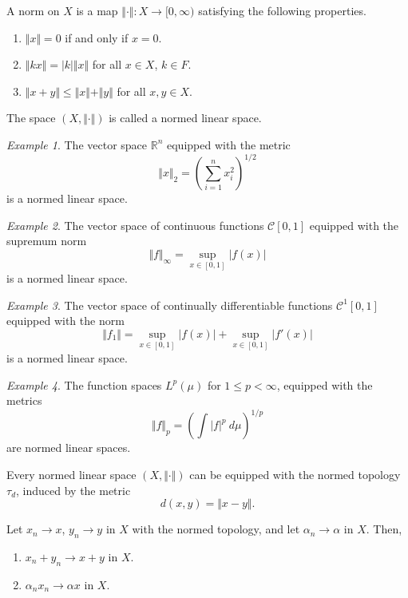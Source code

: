 \documentclass[11pt]{article}
\newcommand{\R}{\mathbb{R}}
\newcommand{\norm}[1]{\Vert #1 \Vert}
\theoremstyle{definition}
\theoremstyle{remark}
\newtheorem*{example}{Example}
\begin{document}
    \begin{definition}
        A norm on $X$ is a map $\norm{\cdot}\colon X \to [0, \infty)$ satisfying the
        following properties. \begin{enumerate}
            \item $\norm{x} = 0$ if and only if $x = 0$.
            \item $\norm{kx} = |k|\norm{x}$ for all $x \in X$, $k \in F$.
            \item $\norm{x + y} \leq \norm{x} + \norm{y}$ for all $x, y \in X$.
        \end{enumerate}
        The space $(X, \norm{\cdot})$ is called a normed linear space.
    \end{definition}
    \begin{example}
        The vector space $\R^n$ equipped with the metric \[
            \norm{x}_2 = \left(\sum_{i = 1}^n x_i^2\right)^{1 / 2}
        \] is a normed linear space.
    \end{example}
    \begin{example}
        The vector space of continuous functions $\mathcal{C}[0, 1]$ equipped with
        the supremum norm \[
            \norm{f}_\infty = \sup_{x \in [0, 1]} |f(x)|
        \] is a normed linear space.
    \end{example}
    \begin{example}
        The vector space of continually differentiable functions $\mathcal{C}^1[0,
        1]$ equipped with the norm \[
            \norm{f_1 } = \sup_{x \in [0, 1]}|f(x)| + \sup_{x \in [0, 1]}|f'(x)|
        \] is a normed linear space.
    \end{example}
    \begin{example}
        The function spaces $L^p(\mu)$ for $1 \leq p < \infty$, equipped with the
        metrics \[
            \norm{f}_p = \left(\int |f|^p \:d\mu\right)^{1 / p}
        \] are normed linear spaces.
    \end{example}

    \begin{definition}
        Every normed linear space $(X, \norm{\cdot})$ can be equipped with the normed
        topology $\tau_d$, induced by the metric \[
            d(x, y) = \norm{x - y}.
        \]
    \end{definition}

    \begin{lemma}
        Let $x_n \to x$, $y_n \to y$ in $X$ with the normed topology, and let
        $\alpha_n \to \alpha$ in $X$. Then, \begin{enumerate}
            \item $x_n + y_n \to x + y$ in $X$.
            \item $\alpha_n x_n \to \alpha x$ in $X$.
        \end{enumerate}
    \end{lemma}
\end{document}

